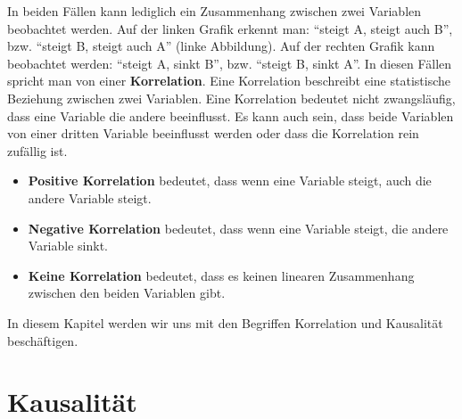 In beiden Fällen kann lediglich ein Zusammenhang zwischen zwei Variablen beobachtet werden. Auf der linken Grafik erkennt man: \enquote{steigt A, steigt auch B}, bzw. \enquote{steigt B, steigt auch A} (linke Abbildung). Auf der rechten Grafik kann beobachtet werden: \enquote{steigt A, sinkt B}, bzw. \enquote{steigt B, sinkt  A}. In diesen Fällen spricht man von einer \textbf{Korrelation}. Eine Korrelation beschreibt eine statistische Beziehung zwischen zwei Variablen. Eine Korrelation bedeutet nicht zwangsläufig, dass eine Variable die andere beeinflusst. Es kann auch sein, dass beide Variablen von einer dritten Variable beeinflusst werden oder dass die Korrelation rein zufällig ist.
\begin{itemize}
    \item \textbf{Positive Korrelation} bedeutet, dass wenn eine Variable steigt, auch die andere Variable steigt.
    \item \textbf{Negative Korrelation} bedeutet, dass wenn eine Variable steigt, die andere Variable sinkt.
    \item \textbf{Keine Korrelation} bedeutet, dass es keinen linearen Zusammenhang zwischen den beiden Variablen gibt.
\end{itemize}

In diesem Kapitel werden wir uns mit den Begriffen Korrelation und Kausalität beschäftigen.

\section{Kausalität}

